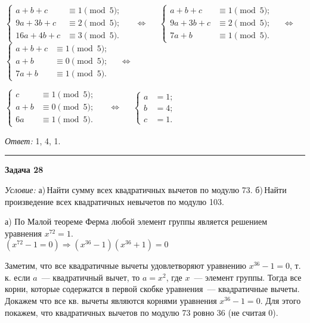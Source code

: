\documentclass[12pt,a4paper]{article}
\newcommand{\so}{\Rightarrow}
\newcommand{\sbs}{\large \bfseries}
\newcommand{\rl}{\vspace{16pt} \hrule \vspace{8pt}}
\begin{document}
$\left\{
\begin{aligned}
a+b+c & \equiv 1\pmod{5}; \\
9a+3b+c & \equiv 2\pmod{5}; \\
16a+4b+c & \equiv 3\pmod{5}.
\end{aligned}
\right.$
$\quad \Leftrightarrow \quad $
$\left\{
\begin{aligned}
a+b+c & \equiv 1\pmod{5}; \\
9a+3b+c & \equiv 2\pmod{5}; \\
7a+b & \equiv 1\pmod{5}.
\end{aligned}
\right.
\quad \Leftrightarrow \quad $
$\left\{
\begin{aligned}
a+b+c & \equiv 1\pmod{5}; \\
a+b & \equiv 0\pmod{5}; \\
7a+b & \equiv 1\pmod{5}.
\end{aligned}
\right.
\quad \Leftrightarrow \quad $

$\left\{
\begin{aligned}
c & \equiv 1\pmod{5}; \\
a+b & \equiv 0\pmod{5}; \\
6a & \equiv 1\pmod{5}.
\end{aligned}
\right.$
$\quad \Leftrightarrow \quad $
$\left\{
\begin{aligned}
a &= 1; \\
b &=4; \\
c &=1.
\end{aligned}
\right.$

{\itshape Ответ: } 1, 4, 1.




\rl
{\sbs Задача 28}

{\itshape Условие: } а)\,Найти сумму всех квадратичных вычетов по модулю 73. б)\,Найти произведение всех квадратичных невычетов по модулю 103.

а) По Малой теореме Ферма любой элемент группы является решением уравнения $x^{72} = 1$.\\
$(x^{72} - 1 = 0) \so (x^{36} - 1)(x^{36} + 1) = 0$

Заметим, что все квадратичные вычеты удовлетворяют уравнению $x^{36} - 1 = 0$, т.\,к. если $a$~--- квадратичный вычет, то $a = x^2$, где $x$~--- элемент группы. Тогда все корни, которые содержатся в первой скобке уравнения~--- квадратичные вычеты. Докажем что все кв. вычеты являются корнями уравнения $x^{36} - 1 = 0$. Для этого покажем, что квадратичных вычетов по модулю 73 ровно 36 (не считая 0).
\end{document}
